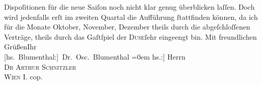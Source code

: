 \begin{ledgroupsized}[t]{13cm}
               Dispoſitionen für die neue Saiſon noch nicht klar genug überblicken laſſen. Doch wird
               jedenfalls erſt im zweiten Quartal die Aufführung ſtattfinden können, da
               ich für die Monate Oktober, November, Dezember
               theils durch die abgeſchloſſenen Verträge, theils durch das Gaſtſpiel der \textsc{Duse}ſehr eingeengt bin.\pend
           \pstart
           Mit freundlichen Grüßen\hspace*{2.5em}Ihr{\\[\baselineskip]}\spacefill\mbox{{[}hs. Blumenthal:{]} Dr. Osc. Blumenthal}\pend
           \leftskip=0em{}\pstart
           \noindent{}{[}hs.:{]} Herrn{\\}\textsc{Dr Arthur Schnitzler}{\\}\textsc{Wien I.}\pend
           \pstart
           cop.\pend
           
         
         \endnumbering{}\end{ledgroupsized}  \newcommand{\dateiname}{L00110}\newcommand{\titel}{Oscar Blumenthal an Arthur Schnitzler, 1. 8. 1892}\newcommand{\editorInnen}{Martin Anton Müller und Gerd-Hermann Susen}
      